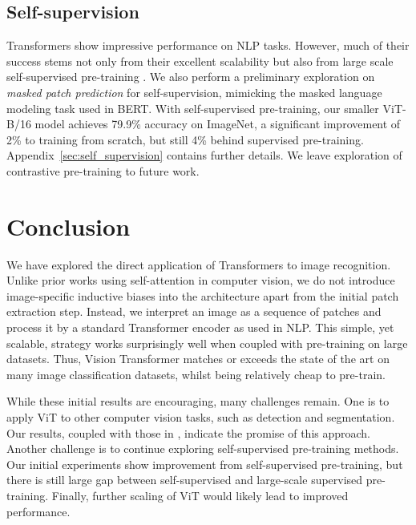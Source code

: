 \subsection{Self-supervision}
Transformers show impressive performance on NLP tasks. However, much of their success stems not only from their excellent scalability but also from large scale self-supervised pre-training \citep{devlin19-bert,radford2018-gpt}. We also perform a preliminary exploration on \textit{masked patch prediction} for self-supervision, mimicking the masked language modeling task used in BERT. With self-supervised pre-training, our smaller ViT-B/16 model achieves 79.9\% accuracy on ImageNet, a significant improvement of 2\% to training from scratch, but still 4\% behind supervised pre-training. Appendix~\ref{sec:self_supervision} contains further details. We leave exploration of contrastive pre-training \citep{Chen2020simclr,he2020moco,bachman2019amdim,henaff2020cpc} to future work.

\section{Conclusion}

We have explored the direct application of Transformers to image recognition. Unlike prior works using self-attention in computer vision, we do not introduce image-specific inductive biases into the architecture apart from the initial patch extraction step. Instead, we interpret an image as a sequence of patches and process it by a standard Transformer encoder as used in NLP. This simple, yet scalable, strategy works surprisingly well when coupled with pre-training on large datasets. Thus, Vision Transformer matches or exceeds the state of the art on many image classification datasets, whilst being relatively cheap to pre-train.

While these initial results are encouraging, many challenges remain. One is to apply ViT to other computer vision tasks, such as detection and segmentation. Our results, coupled with those in \citet{carion20-detr}, indicate the promise of this approach. Another challenge is to continue exploring self-supervised pre-training methods. Our initial experiments show improvement from self-supervised pre-training, but there is still large gap between self-supervised and large-scale supervised pre-training. Finally, further scaling of ViT would likely lead to improved performance.


